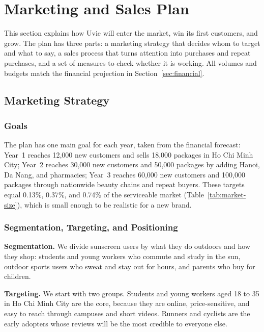 \section{Marketing and Sales Plan}\label{sec:marketing}

This section explains how Uvie will enter the market, win its first customers, and
grow. The plan has three parts: a marketing strategy that decides whom to target and
what to say, a sales process that turns attention into purchases and repeat purchases,
and a set of measures to check whether it is working. All volumes and budgets match
the financial projection in Section~\ref{sec:financial}.

\subsection{Marketing Strategy}

\subsubsection{Goals}
The plan has one main goal for each year, taken from the financial forecast:
Year~1 reaches 12,000 new customers and sells 18,000 packages in Ho Chi Minh City;
Year~2 reaches 30,000 new customers and 50,000 packages by adding Hanoi, Da Nang,
and pharmacies; Year~3 reaches 60,000 new customers and 100,000 packages through
nationwide beauty chains and repeat buyers. These targets equal 0.13\%, 0.37\%, and
0.74\% of the serviceable market (Table~\ref{tab:market-size}), which is small enough
to be realistic for a new brand.

\subsubsection{Segmentation, Targeting, and Positioning}
\textbf{Segmentation.} We divide sunscreen users by what they do outdoors and how they
shop: students and young workers who commute and study in the sun, outdoor sports
users who sweat and stay out for hours, and parents who buy for children.

\textbf{Targeting.} We start with two groups. Students and young workers aged 18 to
35 in Ho Chi Minh City are the core, because they are online, price-sensitive, and
easy to reach through campuses and short videos. Runners and cyclists are the early
adopters whose reviews will be the most credible to everyone else.

